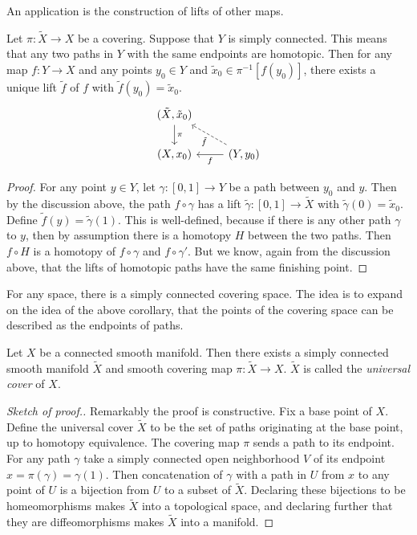 An application is the construction of lifts of other maps.
\begin{corollary}
\textup{\cite[Prop~1.33]{Hatcher}}
Let $\pi : \tilde{X} \to X$ be a covering.
Suppose that $Y$ is simply connected.
This means that any two paths in $Y$ with the same endpoints are homotopic.
Then for any map $f : Y \to X$ and any points $y_0 \in Y$ and $\tilde{x}_0 \in \pi^{-1}[f(y_0)]$, there exists a unique lift $\tilde{f}$ of $f$ with $\tilde{f}(y_0) = \tilde{x}_0$.
\[\begin{tikzcd}
(\tilde{X},\tilde{x}_0) \arrow{d}{\pi} & \\
(X,x_0) & (Y,y_0) \arrow{l}{f} \arrow[dashed]{lu}{\tilde{f}}
\end{tikzcd}\]
\end{corollary}
\begin{proof}
For any point $y \in Y$, let $\gamma : [0,1] \to Y$ be a path between $y_0$ and $y$.
Then by the discussion above, the path $f \circ \gamma$ has a lift $\tilde{\gamma} : [0,1] \to \tilde{X}$ with $\tilde{\gamma}(0) = \tilde{x}_0$.
Define $\tilde{f}(y) = \tilde{\gamma}(1)$.
This is well-defined, because if there is any other path $\gamma$ to $y$, then by assumption there is a homotopy $H$ between the two paths.
Then $f\circ H$ is a homotopy of $f\circ\gamma$ and $f\circ\gamma'$.
But we know, again from the discussion above, that the lifts of homotopic paths have the same finishing point.
\end{proof}

For any space, there is a simply connected covering space.
The idea is to expand on the idea of the above corollary, that the points of the covering space can be described as the endpoints of paths.

\begin{theorem}
\textup{\cite[p.63]{Hatcher}}
Let $X$ be a connected smooth manifold.
Then there exists a simply connected smooth manifold $\tilde{X}$ and smooth covering map $\pi : \tilde{X} \to X$.
$\tilde{X}$ is called the \emph{universal cover} of $X$. 
\end{theorem}
\begin{proof}[Sketch of proof.]
Remarkably the proof is constructive.
Fix a base point of $X$.
Define the universal cover $\tilde{X}$ to be the set of paths originating at the base point, up to homotopy equivalence.
The covering map $\pi$ sends a path to its endpoint.
For any path $\gamma$ take a simply connected open neighborhood $V$ of its endpoint $x = \pi(\gamma) = \gamma(1)$.
Then concatenation of $\gamma$ with a path in $U$ from $x$ to any point of $U$ is a bijection from $U$ to a subset of $\tilde{X}$.
Declaring these bijections to be homeomorphisms makes $\tilde{X}$ into a topological space, and declaring further that they are diffeomorphisms makes $\tilde{X}$ into a manifold.
\end{proof}

